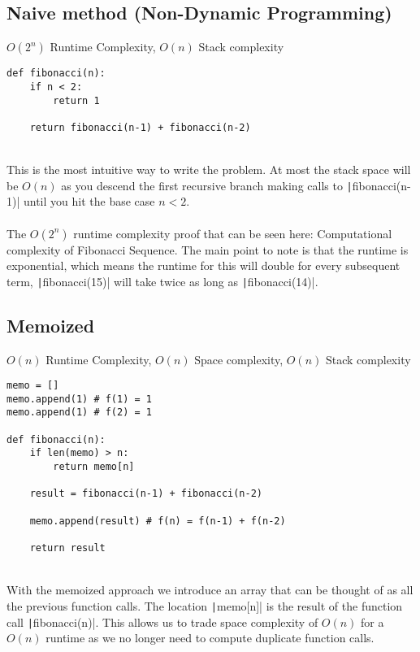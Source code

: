 \documentclass{article}
\newcommand{\inlinecode}[1]{\texttt|#1|}
\begin{document}
		\subsection[Naive]{Naive method (Non-Dynamic Programming)}
			
			$O(2^n)$ Runtime Complexity, $O(n)$ Stack complexity
			
			\begin{verbatim}
def fibonacci(n):
	if n < 2:
		return 1
		
	return fibonacci(n-1) + fibonacci(n-2)
			\end{verbatim}
			\\
			This is the most intuitive way to write the problem. At most the stack space will be $O(n)$ as you descend the ﬁrst recursive branch making calls to \inlinecode{fibonacci(n-1)} until you hit the base case $ n < 2 $.
			\\
			\\
			The $O(2^n)$ runtime complexity proof that can be seen here: Computational complexity of Fibonacci Sequence. The main point to note is that the runtime is exponential, which means the runtime for this will double for every subsequent term, \inlinecode{fibonacci(15)} will take twice as long as \inlinecode{fibonacci(14)}.
			
		\subsection[Memoized]{Memoized}
		
			$O(n)$ Runtime Complexity, $O(n)$ Space complexity, $O(n)$ Stack complexity
			
			\begin{verbatim}
memo = []
memo.append(1) # f(1) = 1
memo.append(1) # f(2) = 1

def fibonacci(n):
	if len(memo) > n:
		return memo[n]
		
	result = fibonacci(n-1) + fibonacci(n-2)
	
	memo.append(result) # f(n) = f(n-1) + f(n-2)
	
	return result
			\end{verbatim}
			\\
			With the memoized approach we introduce an array that can be thought of as all the previous function calls. The location \inlinecode{memo[n]} is the result of the function call \inlinecode{fibonacci(n)}. This allows us to trade space complexity of $O(n)$ for a $O(n)$ runtime as we no longer need to compute duplicate function calls.
	
\end{document}
